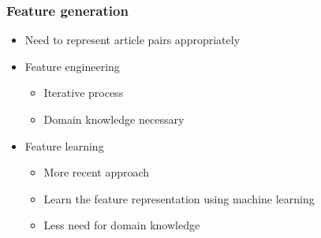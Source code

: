 \begin{frame}
    \frametitle{Feature generation}
    \centering
    \begin{itemize}
      \item Need to represent article pairs appropriately
      \item Feature engineering
        \begin{itemize}
          \item Iterative process
          \item Domain knowledge necessary
        \end{itemize}
      \item Feature learning
        \begin{itemize}
          \item More recent approach
          \item Learn the feature representation using machine learning
          \item Less need for domain knowledge
        \end{itemize}
    \end{itemize}
\end{frame}
\note{
}
